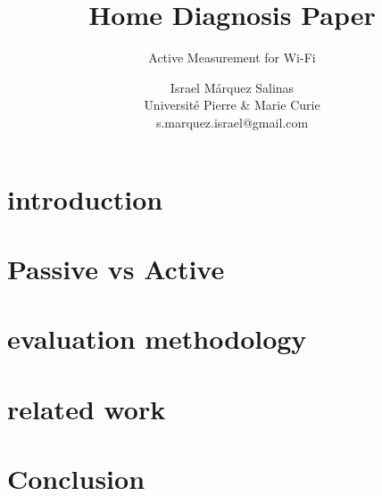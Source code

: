 \documentclass[sigconf]{Template}
\begin{document}
\title{Home Diagnosis Paper}
\subtitle{Active Measurement for Wi-Fi}
\author{Israel M\'{a}rquez Salinas \\Universit\'{e} Pierre \& Marie Curie \\s.marquez.israel@gmail.com}
\maketitle



\section{introduction}\label{Introduction}

\section{Passive vs Active}\label{Passive vs Active}

\section{evaluation methodology}\label{evaluation methodology}

\section{related work}\label{Related Work}

\section{Conclusion}\label{Conclusion}



\end{document}
